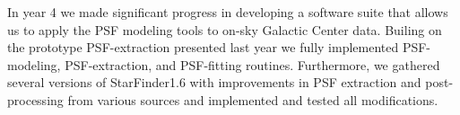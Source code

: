 In year 4 we made significant progress in developing a software suite that allows us to apply the PSF modeling tools to on-sky Galactic Center data. Builing on the prototype PSF-extraction presented last year we fully implemented PSF-modeling, PSF-extraction, and PSF-fitting routines. Furthermore, we gathered several versions of StarFinder1.6 with improvements in PSF extraction and post-processing from various sources and implemented and tested all modifications.
  